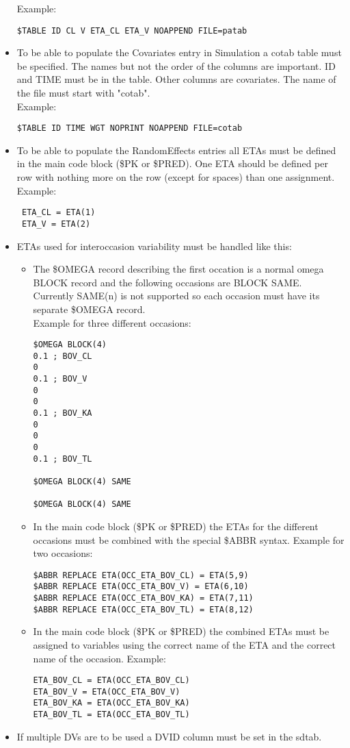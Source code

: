 \begin{itemize}
    Example:
        \begin{verbatim}
$TABLE ID CL V ETA_CL ETA_V NOAPPEND FILE=patab
        \end{verbatim}
    \item To be able to populate the Covariates entry in Simulation a cotab table must be specified. The names but not the order of the columns are important. ID and TIME must be in the table. Other columns are covariates. The name of the file must start with "cotab".\\ Example:
        \begin{verbatim}
$TABLE ID TIME WGT NOPRINT NOAPPEND FILE=cotab
        \end{verbatim}
    \item To be able to populate the RandomEffects entries all ETAs must be defined in the main code block (\$PK or \$PRED). One ETA should be defined per row with nothing more on the row (except for spaces) than one assignment.\newpage 
     Example:
        \begin{verbatim}
 ETA_CL = ETA(1)
 ETA_V = ETA(2)
        \end{verbatim}
    \item ETAs used for interoccasion variability must be handled like this:
        \begin{itemize}
            \item The \$OMEGA record describing the first occation is a normal omega BLOCK record and the following occasions are BLOCK SAME. Currently SAME(n) is not supported so each occasion must have its separate \$OMEGA record.\\ Example for three different occasions:
            \begin{verbatim}
$OMEGA BLOCK(4)
0.1 ; BOV_CL
0
0.1 ; BOV_V
0
0
0.1 ; BOV_KA
0
0
0
0.1 ; BOV_TL

$OMEGA BLOCK(4) SAME

$OMEGA BLOCK(4) SAME
            \end{verbatim}
            \item In the main code block (\$PK or \$PRED) the ETAs for the different occasions must be combined with the special \$ABBR syntax. Example for two occasions:
            \begin{verbatim}
$ABBR REPLACE ETA(OCC_ETA_BOV_CL) = ETA(5,9)
$ABBR REPLACE ETA(OCC_ETA_BOV_V) = ETA(6,10)
$ABBR REPLACE ETA(OCC_ETA_BOV_KA) = ETA(7,11)
$ABBR REPLACE ETA(OCC_ETA_BOV_TL) = ETA(8,12)
            \end{verbatim}
        \item In the main code block (\$PK or \$PRED) the combined ETAs must be assigned to variables using the correct name of the ETA and the correct name of the occasion. Example:
            \begin{verbatim}
ETA_BOV_CL = ETA(OCC_ETA_BOV_CL)
ETA_BOV_V = ETA(OCC_ETA_BOV_V)
ETA_BOV_KA = ETA(OCC_ETA_BOV_KA)
ETA_BOV_TL = ETA(OCC_ETA_BOV_TL)
            \end{verbatim}
        \end{itemize}
    \item If multiple DVs are to be used a DVID column must be set in the sdtab.
\end{itemize}
